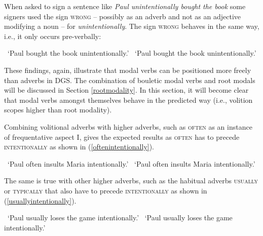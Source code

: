 When asked to sign a sentence like \textit{Paul unintentionally bought the book} some signers used the sign \textsc{wrong} -- possibly as an adverb and not as an adjective modifying a noun -- for \textit{unintentionally}. The sign \textsc{wrong} behaves in the same way, i.e., it only occurs pre-verbally:

\begin{exe}
\ex\begin{xlist} 
\glt \textcolor{white}{*}`Paul bought the book unintentionally.' \label{ex:intentionallya}
\glt \textcolor{white}{*}`Paul bought the book unintentionally.'  \label{ex:intentionallyb}
\end{xlist}
\end{exe} 

\noindent These findings, again, illustrate that modal verbs can be positioned more freely than adverbs in DGS. The combination of bouletic modal verbs and root modals will be discussed in Section \ref{rootmodality}. In this section, it will become clear that modal verbs amongst themselves behave in the predicted way (i.e., volition scopes higher than root modality). 

Combining volitional adverbs with higher adverbs, such as \textsc{often} as an instance of frequentative aspect I, gives the expected results as \textsc{often} has to precede \textsc{intentionally} as shown in (\ref{oftenintentionally}). 

\begin{exe}
\ex\label{oftenintentionally}\begin{xlist} 
\glt \textcolor{white}{*}`Paul often insults Maria intentionally.' \label{ex:oftenintentionallya}
\glt \textcolor{white}{*}`Paul often insults Maria intentionally.'  \label{ex:oftenintentionallyb}
\end{xlist}
\end{exe} 

\noindent The same is true with other higher adverbs, such as the habitual adverbs \textsc{usually} or \textsc{typically} that also have to precede \textsc{intentionally} as shown in (\ref{usuallyintentionally}).

\begin{exe}
\ex\label{usuallyintentionally}\begin{xlist} 
\glt \textcolor{white}{*}`Paul usually loses the game intentionally.' \label{ex:usuallyintentionallya}
\glt \textcolor{white}{*}`Paul usually loses the game intentionally.'  \label{ex:usuallyintentionallyb}
\end{xlist}
\end{exe} 

